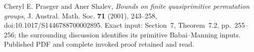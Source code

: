 Cheryl E. Praeger and Aner Shalev,
\emph{Bounds on finite quasiprimitive permutation groups},
J. Austral. Math. Soc. \textbf{71} (2001), 243--258,
doi:10.1017/S1446788700002895.
Exact input: Section~7, Theorem~7.2, pp.~255--256;
the surrounding discussion identifies its primitive Babai--Manning
inputs. Published PDF and complete invoked proof retained and read.
